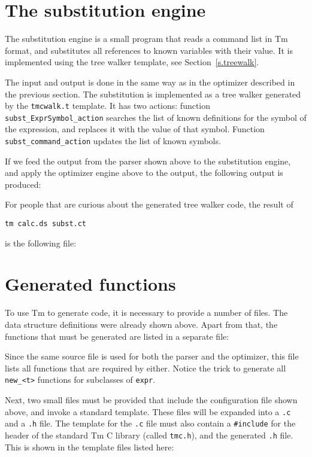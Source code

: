 \section{The substitution engine}
The substitution engine is a small program that reads a command list
in Tm format, and substitutes all references to known variables with
their value.
It is implemented using the tree walker template, see Section~\ref{s.treewalk}.
\begin{showfile}

\end{showfile}
The input and output is done in the same way as in the optimizer 
described in the previous section. The substitution is implemented as
a tree walker generated by the \verb'tmcwalk.t' template. It has
two actions: function \verb'subst_ExprSymbol_action' searches the list
of known definitions for the symbol of the expression, and replaces
it with the value of that symbol. Function \verb'subst_command_action'
updates the list of known symbols.
\par
If we feed the output from the parser shown above to the substitution
engine, and apply the optimizer engine above to the output, the following
output is produced:
\begin{showfile}
\end{showfile}
\par
For people that are curious about the generated tree walker code, 
the result of
\begin{verbatim}
tm calc.ds subst.ct
\end{verbatim}
is the following file:
\begin{showfile}
\end{showfile}
\section{Generated functions}
To use Tm to generate code, it is necessary to provide a
number of files. The data structure definitions were already shown above.
Apart from that, the functions that must be generated are listed in a
separate file:
\begin{showfile}
\end{showfile}
Since the same source file is used for both the parser and the
optimizer, this file lists all functions that are required by either.
Notice the trick to generate all \verb'new_<t>' functions for subclasses
of {\tt expr}.

Next, two small files must be provided that include the configuration
file shown above, and invoke a standard template. These files will be
expanded into a \verb'.c' and a \verb'.h' file. The template for the
\verb'.c' file must also contain a \verb'#include' for the header of the
standard Tm C library (called \verb'tmc.h'), and the generated \verb'.h'
file. This is shown in the template files listed here:

